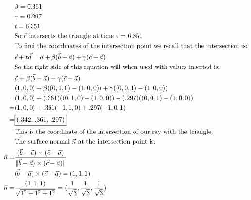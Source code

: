 \documentclass[a4paper, 12pt]{article}
\newcommand{\norm}[1]{\lVert#1\rVert}
\begin{document}
\begin{enumerate}
    \begin{align*}
        &\beta = 0.361\\
        &\gamma = 0.297\\
        &t = 6.351\\
        &\text{So $\vec{r}$ intersects the triangle at time t = 6.351}\\
        &\text{To find the coordinates of the intersection point we recall that the intersection is:}\\
        &\vec{e} + t\vec{d} = \vec{a} + \beta(\vec{b} - \vec{a}) + \gamma(\vec{c} - \vec{a})\\
        &\text{So the right side of this equation will when used with values inserted is:}\\
        &\vec{a} + \beta(\vec{b} - \vec{a}) + \gamma(\vec{c} - \vec{a})\\
        &(1,0,0) + \beta((0,1,0) - (1,0,0)) + \gamma((0,0,1) - (1,0,0))\\
        =&(1,0,0) + (.361)((0,1,0) - (1,0,0)) + (.297)((0,0,1) - (1,0,0))\\
        =&(1,0,0) + .361(-1,1,0) + .297(-1,0,1)\\
        =&\fbox{(.342, .361, .297)}\\
        &\text{This is the coordinate of the intersection of our ray with the triangle.}\\
        &\text{The surface normal $\vec{n}$ at the intersection point is:}\\
        \vec{n} =& \frac{(\vec{b} - \vec{a}) \times (\vec{c} - \vec{a})}{\norm{\vec{b} - \vec{a}) \times (\vec{c} - \vec{a})}}\\
        &(\vec{b} - \vec{a}) \times (\vec{c} - \vec{a}) = (1,1,1)\\
        \vec{n} =& \frac{(1,1,1)}{\sqrt{1^2 + 1^2 + 1^2}} = (\frac{1}{\sqrt{3}}, \frac{1}{\sqrt{3}}, \frac{1}{\sqrt{3}})\\
    \end{align*}


\end{enumerate}
\end{document}
